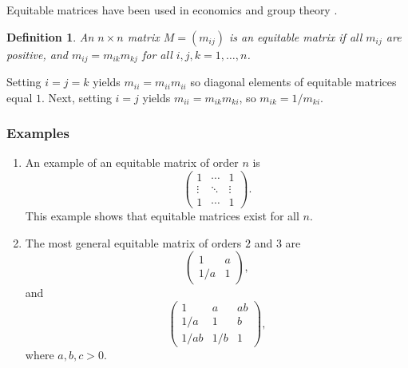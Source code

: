 \documentclass[12pt]{article}
\newtheorem{defn}{Definition}
\begin{document}
Equitable matrices have been used in economics and group theory
 \cite{eves}. 

\begin{defn} An $n\times n$ matrix $M=(m_{ij})$ is an 
\emph{equitable matrix} if all $m_{ij}$ are positive, and 
$m_{ij}=m_{ik} m_{kj}$ for all $i,j,k=1,\ldots, n$.
\end{defn}

Setting $i=j=k$ yields $m_{ii}=m_{ii} m_{ii}$ so diagonal elements of
equitable matrices equal $1$. Next, setting $i=j$ yields
$m_{ii}=m_{ik} m_{ki}$, so $m_{ik} =1/m_{ki}$.

\subsubsection*{Examples}
\begin{enumerate}
\item 
An example of an equitable matrix of order $n$ is
$$
  \begin{pmatrix} 1 & \cdots & 1 \\
                  \vdots & \ddots & \vdots \\
                  1 & \cdots & 1 \end{pmatrix}.
$$
This example shows that equitable matrices exist for all $n$. 
\item The most general equitable matrix of orders $2$ and $3$ are
$$
  \begin{pmatrix} 1 & a \\
                  1/a & 1 \end{pmatrix},
$$
and
$$
  \begin{pmatrix} 1 & a & ab  \\
                  1/a & 1 &b \\
                  1/ab & 1/b & 1 \end{pmatrix},
$$
where $a,b,c>0$. 

\end{enumerate}
\end{document}
